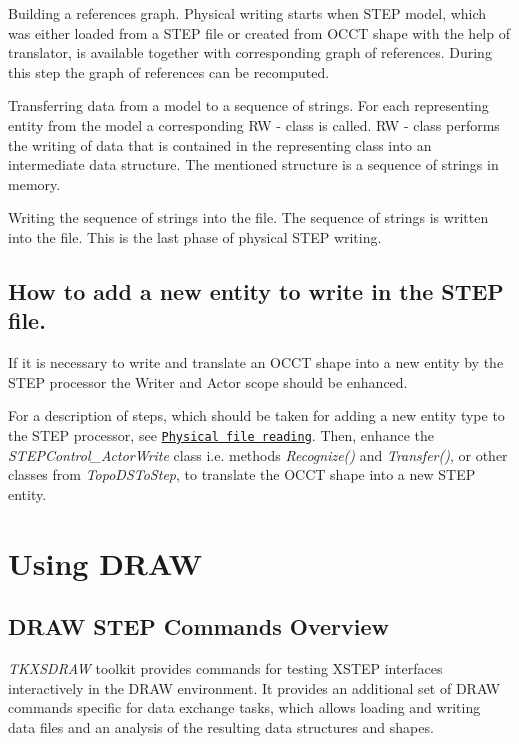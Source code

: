 \begin{DoxyEnumerate}
\item Building a references graph. Physical writing starts when S\+T\+EP model, which was either loaded from a S\+T\+EP file or created from O\+C\+CT shape with the help of translator, is available together with corresponding graph of references. During this step the graph of references can be recomputed.
\item Transferring data from a model to a sequence of strings. For each representing entity from the model a corresponding RW -\/ class is called. RW -\/ class performs the writing of data that is contained in the representing class into an intermediate data structure. The mentioned structure is a sequence of strings in memory.
\item Writing the sequence of strings into the file. The sequence of strings is written into the file. This is the last phase of physical S\+T\+EP writing.
\end{DoxyEnumerate}\hypertarget{occt_user_guides__step_occt_step_4_5}{}\subsection{How to add a new entity to write in the S\+T\+E\+P file.}\label{occt_user_guides__step_occt_step_4_5}
If it is necessary to write and translate an O\+C\+CT shape into a new entity by the S\+T\+EP processor the Writer and Actor scope should be enhanced.

For a description of steps, which should be taken for adding a new entity type to the S\+T\+EP processor, see \href{#occt_step_4_2}{\tt Physical file reading}. Then, enhance the {\itshape S\+T\+E\+P\+Control\+\_\+\+Actor\+Write} class i.\+e. methods {\itshape Recognize()} and {\itshape Transfer()}, or other classes from {\itshape Topo\+D\+S\+To\+Step}, to translate the O\+C\+CT shape into a new S\+T\+EP entity.\hypertarget{occt_user_guides__step_occt_step_6}{}\section{Using D\+R\+AW}\label{occt_user_guides__step_occt_step_6}
\hypertarget{occt_user_guides__step_occt_step_6_1}{}\subsection{D\+R\+A\+W S\+T\+E\+P Commands Overview}\label{occt_user_guides__step_occt_step_6_1}
{\itshape T\+K\+X\+S\+D\+R\+AW} toolkit provides commands for testing X\+S\+T\+EP interfaces interactively in the D\+R\+AW environment. It provides an additional set of D\+R\+AW commands specific for data exchange tasks, which allows loading and writing data files and an analysis of the resulting data structures and shapes.

